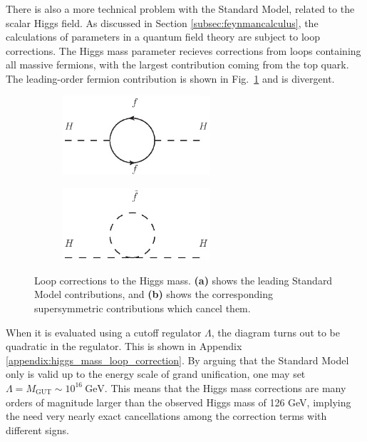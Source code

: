 \documentclass[twoside,english]{uiofysmaster}
\begin{document}
There is also a more technical problem with the Standard Model, related to the scalar Higgs field. As discussed in Section \ref{subsec:feynmancalculus}, the calculations of parameters in a quantum field theory are subject to loop corrections. The Higgs mass parameter recieves corrections from loops containing all massive fermions, with the largest contribution coming from the top quark. The leading-order fermion contribution is shown in Fig.\ \ref{fig:higgs_correction_a} and is divergent.
\begin{figure}[htbp]
	\centering
	\begin{subfigure}[b]{0.49\textwidth}
		\centering
		\includegraphics[width=0.6\textwidth]{figures/susyintro/higgs_top_loop.eps}
		\caption{ }
		\label{fig:higgs_correction_a}
	\end{subfigure}
	\begin{subfigure}[b]{0.49\textwidth}
		\centering
		\includegraphics[width=0.6\textwidth]{figures/susyintro/higgs_stop_loop.eps}
		\caption{ }
		\label{fig:higgs_correction_b}
	\end{subfigure}
	\caption{Loop corrections to the Higgs mass. {\bf (a)} shows the leading Standard Model contributions, and {\bf (b)} shows the corresponding supersymmetric contributions which cancel them.}
	\label{fig:higgs_correction}
\end{figure}
When it is evaluated using a cutoff regulator $\Lambda$, the diagram turns out to be quadratic in the regulator. This is shown in Appendix \ref{appendix:higgs_mass_loop_correction}. By arguing that the Standard Model only is valid up to the energy scale of grand unification, one may set $\Lambda = M_{\mathrm{GUT}} \sim 10^{16}~\mathrm{GeV}$. This means that the Higgs mass corrections are many orders of magnitude larger than the observed Higgs mass of 126 GeV, implying the need very nearly exact cancellations among the correction terms with different signs.
\end{document}
